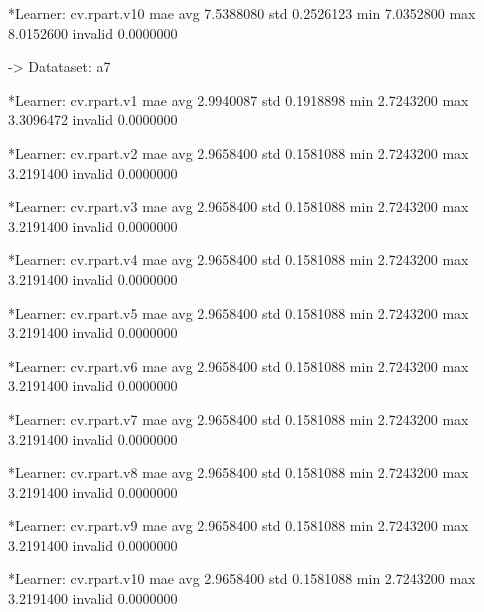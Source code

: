 \documentclass{article}
\begin{document}
\begin{Schunk}
\begin{Soutput}
	*Learner: cv.rpart.v10 
              mae
avg     7.5388080
std     0.2526123
min     7.0352800
max     8.0152600
invalid 0.0000000


-> Datataset:  a7 

	*Learner: cv.rpart.v1 
              mae
avg     2.9940087
std     0.1918898
min     2.7243200
max     3.3096472
invalid 0.0000000

	*Learner: cv.rpart.v2 
              mae
avg     2.9658400
std     0.1581088
min     2.7243200
max     3.2191400
invalid 0.0000000

	*Learner: cv.rpart.v3 
              mae
avg     2.9658400
std     0.1581088
min     2.7243200
max     3.2191400
invalid 0.0000000

	*Learner: cv.rpart.v4 
              mae
avg     2.9658400
std     0.1581088
min     2.7243200
max     3.2191400
invalid 0.0000000

	*Learner: cv.rpart.v5 
              mae
avg     2.9658400
std     0.1581088
min     2.7243200
max     3.2191400
invalid 0.0000000

	*Learner: cv.rpart.v6 
              mae
avg     2.9658400
std     0.1581088
min     2.7243200
max     3.2191400
invalid 0.0000000

	*Learner: cv.rpart.v7 
              mae
avg     2.9658400
std     0.1581088
min     2.7243200
max     3.2191400
invalid 0.0000000

	*Learner: cv.rpart.v8 
              mae
avg     2.9658400
std     0.1581088
min     2.7243200
max     3.2191400
invalid 0.0000000

	*Learner: cv.rpart.v9 
              mae
avg     2.9658400
std     0.1581088
min     2.7243200
max     3.2191400
invalid 0.0000000

	*Learner: cv.rpart.v10 
              mae
avg     2.9658400
std     0.1581088
min     2.7243200
max     3.2191400
invalid 0.0000000
\end{Soutput}
\end{Schunk}
\end{document}
